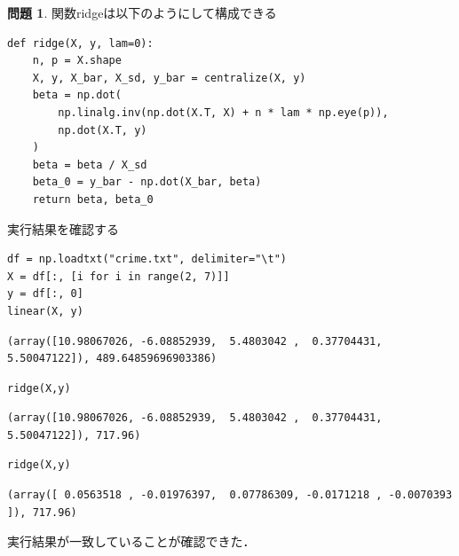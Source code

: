 \documentclass[titlepage]{jsarticle}
\theoremstyle{definition}
\newtheorem{Ex}{問題}
\theoremstyle{mystyle} %
\renewcommand{\footnotesize}{\normalsize}
\begin{document}
\begin{Ex}
関数ridgeは以下のようにして構成できる
\begin{lstlisting}[basicstyle = \ttfamily\footnotesize, frame = single]
def ridge(X, y, lam=0):
    n, p = X.shape
    X, y, X_bar, X_sd, y_bar = centralize(X, y)
    beta = np.dot(
        np.linalg.inv(np.dot(X.T, X) + n * lam * np.eye(p)),
        np.dot(X.T, y)
    )
    beta = beta / X_sd
    beta_0 = y_bar - np.dot(X_bar, beta)
    return beta, beta_0
\end{lstlisting}
実行結果を確認する
\begin{lstlisting}[basicstyle = \ttfamily\footnotesize, frame = single]
df = np.loadtxt("crime.txt", delimiter="\t")
X = df[:, [i for i in range(2, 7)]]
y = df[:, 0]
linear(X, y)
\end{lstlisting}
\begin{lstlisting}[basicstyle = \ttfamily\footnotesize, frame = single]
(array([10.98067026, -6.08852939,  5.4803042 ,  0.37704431,  5.50047122]), 489.64859696903386)
\end{lstlisting}
\begin{lstlisting}[basicstyle = \ttfamily\footnotesize, frame = single]
ridge(X,y)
\end{lstlisting}
\begin{lstlisting}[basicstyle = \ttfamily\footnotesize, frame = single]
(array([10.98067026, -6.08852939,  5.4803042 ,  0.37704431,  5.50047122]), 717.96)
\end{lstlisting}
\begin{lstlisting}[basicstyle = \ttfamily\footnotesize, frame = single]
ridge(X,y)
\end{lstlisting}
\begin{lstlisting}[basicstyle = \ttfamily\footnotesize, frame = single]
(array([ 0.0563518 , -0.01976397,  0.07786309, -0.0171218 , -0.0070393 ]), 717.96)
\end{lstlisting}
実行結果が一致していることが確認できた．
\end{Ex}
\end{document}
